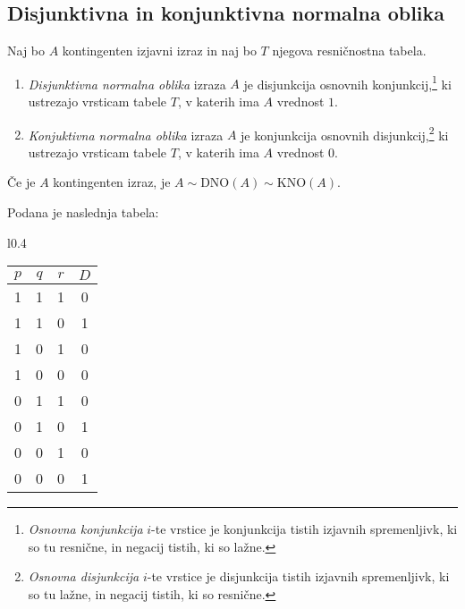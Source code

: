 \documentclass[12pt, a4paper]{article}
\begin{document}
\newpage

\subsection{Disjunktivna in konjunktivna normalna oblika}

\begin{okvir}
\begin{definicija}
Naj bo  $A$ kontingenten izjavni izraz in naj bo $T$ njegova resničnostna tabela.

\begin{enumerate}[label=(\roman*)]
\item \emph{Disjunktivna normalna oblika} izraza $A$ je disjunkcija osnovnih konjunkcij,\footnote{\emph{Osnovna konjunkcija} $i$-te vrstice je konjunkcija tistih izjavnih spremenljivk, ki so tu resnične, in negacij tistih, ki so lažne.}
ki ustrezajo vrsticam tabele $T$, v katerih ima $A$ vrednost $1$.

\item \emph{Konjuktivna normalna oblika} izraza $A$ je konjunkcija osnovnih disjunkcij,\footnote{\emph{Osnovna disjunkcija} $i$-te vrstice je disjunkcija tistih izjavnih spremenljivk, ki so tu lažne, in negacij tistih, ki so resnične.}
ki ustrezajo vrsticam tabele $T$, v katerih ima $A$ vrednost $0$. 
\end{enumerate}
\end{definicija}
\end{okvir}

\begin{trditev}
Če je $A$ kontingenten izraz, je $A\sim \text{DNO}(A)\sim \text{KNO}(A)$.
\end{trditev}

\obvs

\begin{zgled}\label{zg:2}
Podana je naslednja tabela:
\end{zgled}

\begin{wraptable}[9]{l}{0.4\textwidth}
\vspace{-0.7cm}
\centering
\begin{tabular}{ccc||c}
$p$ & $q$ & $r$ & $D$ \\
\hline\hline
1 & 1 & 1 & 0 \\
1 & 1 & 0 & 1 \\
1 & 0 & 1 & 0 \\
1 & 0 & 0 & 0 \\
0 & 1 & 1 & 0 \\
0 & 1 & 0 & 1 \\
0 & 0 & 1 & 0 \\
0 & 0 & 0 & 1 \\
\end{tabular}
\caption{Zgled \ref{zg:2}}
\end{wraptable}
\end{document}
